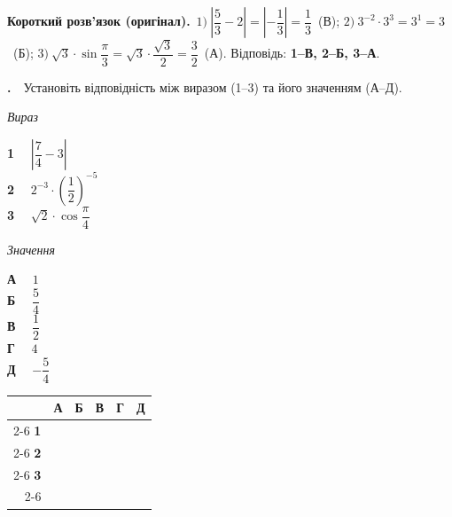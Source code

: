 \documentclass[12pt]{article}
\newcommand{\matchingGrid}{%
    \begingroup
    \renewcommand{\arraystretch}{1.15}
    \setlength{\tabcolsep}{4pt}
    \footnotesize
    \begin{tabular}{r|c|c|c|c|c|}
         \multicolumn{1}{c}{} & \multicolumn{1}{c}{\textbf{А}} & \multicolumn{1}{c}{\textbf{Б}} & \multicolumn{1}{c}{\textbf{В}} & \multicolumn{1}{c}{\textbf{Г}} & \multicolumn{1}{c}{\textbf{Д}} \\ \cline{2-6}
         \textbf{1} & \phantom{X} & \phantom{X} & \phantom{X} & \phantom{X} & \phantom{X} \\ \cline{2-6}
         \textbf{2} & & & & & \\ \cline{2-6}
         \textbf{3} & & & & & \\ \cline{2-6}
    \end{tabular}
    \endgroup
}
\newcounter{zad}
\newcommand{\zadtask}[1]{\stepcounter{zad}\noindent\textbf{\thezad.}\ \ #1\par\vspace{0.2cm}}
\newcommand{\solution}[1]{%
\par\vspace{0.12cm}
\begin{tcolorbox}[colback=titleBg!45, colframe=mainGreen!55, boxrule=0.4pt, arc=2pt,
    left=6pt, right=6pt, top=3pt, bottom=3pt, breakable]
\footnotesize\textbf{Короткий розв'язок (оригінал).}\ #1
\end{tcolorbox}
\par\vspace{0.12cm}
}
\begin{document}
\solution{$1)\ \left|\dfrac{5}{3}-2\right|=\left|-\dfrac{1}{3}\right|=\dfrac{1}{3}$~(В); $2)\ 3^{-2}\cdot 3^{3}=3^{1}=3$~(Б); $3)\ \sqrt{3}\cdot\sin\dfrac{\pi}{3}=\sqrt{3}\cdot\dfrac{\sqrt{3}}{2}=\dfrac{3}{2}$~(А). Відповідь: \textbf{1--В, 2--Б, 3--А}.}
\zadtask{Установіть відповідність між виразом (1--3) та його значенням (А--Д).

\vspace{0.3cm}

\noindent
\begin{minipage}[t]{0.52\textwidth}
\textit{Вираз} \par \vspace{0.2cm}
\textbf{1} \ \ $\left|\dfrac{7}{4} - 3\right|$\\[0.35cm]
\textbf{2} \ \ $2^{-3} \cdot \left(\dfrac{1}{2}\right)^{-5}$\\[0.35cm]
\textbf{3} \ \ $\sqrt{2} \cdot \cos\dfrac{\pi}{4}$
\end{minipage}
\begin{minipage}[t]{0.24\textwidth}
\textit{Значення} \par \vspace{0.2cm}
\textbf{А} \ \ $1$\\[0.15cm]
\textbf{Б} \ \ $\dfrac{5}{4}$\\[0.15cm]
\textbf{В} \ \ $\dfrac{1}{2}$\\[0.15cm]
\textbf{Г} \ \ $4$\\[0.15cm]
\textbf{Д} \ \ $-\dfrac{5}{4}$
\end{minipage}
\hfill
\begin{minipage}[t]{0.22\textwidth}
\vspace{-0.2cm}
\begin{flushright}\matchingGrid\end{flushright}
\end{minipage}
}
\end{document}
